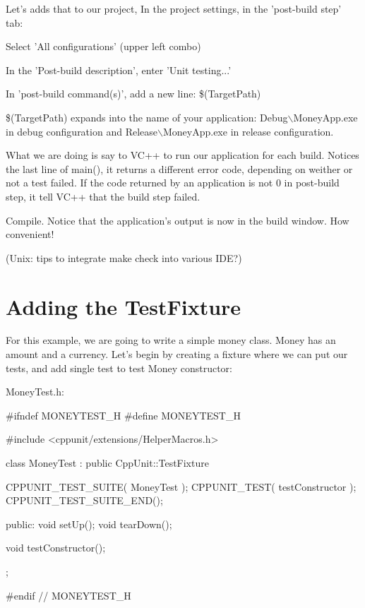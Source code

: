 Let's adds that to our project, In the project settings, in the 'post-\/build step' tab:
\begin{DoxyItemize}
\item Select 'All configurations' (upper left combo)
\item In the 'Post-\/build description', enter 'Unit testing...'
\item In 'post-\/build command(s)', add a new line: {\ttfamily \$(TargetPath)}
\end{DoxyItemize}

{\ttfamily \$(TargetPath)} expands into the name of your application: Debug$\backslash$MoneyApp.exe in debug configuration and Release$\backslash$MoneyApp.exe in release configuration.

What we are doing is say to VC++ to run our application for each build. Notices the last line of {\ttfamily main()}, it returns a different error code, depending on weither or not a test failed. If the code returned by an application is not 0 in post-\/build step, it tell VC++ that the build step failed.

Compile. Notice that the application's output is now in the build window. How convenient!

(Unix: tips to integrate make check into various IDE?)\hypertarget{money_example_sec_adding_testfixture}{}\section{Adding the TestFixture}\label{money_example_sec_adding_testfixture}
For this example, we are going to write a simple money class. Money has an amount and a currency. Let's begin by creating a fixture where we can put our tests, and add single test to test Money constructor:

{\ttfamily MoneyTest.h:} 
\begin{DoxyCode}
#ifndef MONEYTEST_H
#define MONEYTEST_H

#include <cppunit/extensions/HelperMacros.h>

class MoneyTest : public CppUnit::TestFixture
{
  CPPUNIT_TEST_SUITE( MoneyTest );
  CPPUNIT_TEST( testConstructor );
  CPPUNIT_TEST_SUITE_END();

public:
  void setUp();
  void tearDown();

  void testConstructor();
};

#endif  // MONEYTEST_H
\end{DoxyCode}



